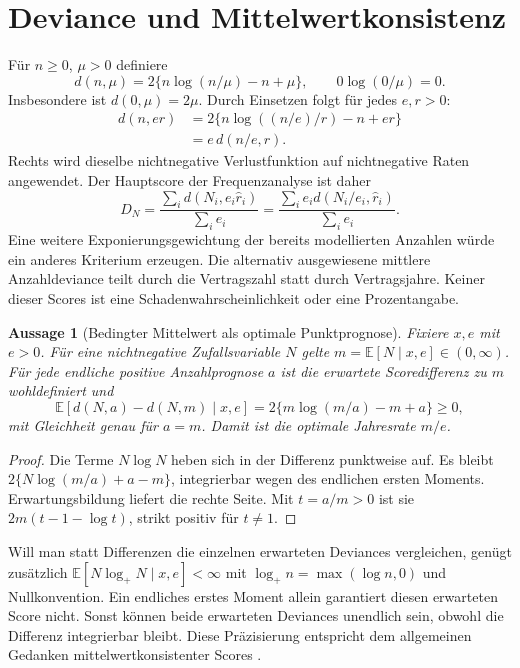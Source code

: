 \documentclass[11pt,a4paper]{article}
\newcommand{\E}{\mathbb E}
\newtheorem{proposition}{Aussage}
\begin{document}
\clearpage
\section{Deviance und Mittelwertkonsistenz}
Für $n\geq0$, $\mu>0$ definiere
\begin{equation}
 d(n,\mu)=2\{n\log(n/\mu)-n+\mu\},\qquad 0\log(0/\mu)=0.
\end{equation}
Insbesondere ist $d(0,\mu)=2\mu$. Durch Einsetzen folgt für jedes $e,r>0$:
\begin{align}
 d(n,er)&=2\{n\log((n/e)/r)-n+er\}\\
        &=e\,d(n/e,r).\label{eq:identity}
\end{align}
Rechts wird dieselbe nichtnegative Verlustfunktion auf nichtnegative Raten angewendet. Der Hauptscore der Frequenzanalyse ist daher
\begin{equation}
 D_N=\frac{\sum_i d(N_i,e_i\widehat r_i)}{\sum_i e_i}
     =\frac{\sum_i e_i d(N_i/e_i,\widehat r_i)}{\sum_i e_i}.
\end{equation}
Eine weitere Exponierungsgewichtung der bereits modellierten Anzahlen würde ein anderes Kriterium erzeugen. Die alternativ ausgewiesene mittlere Anzahldeviance teilt durch die Vertragszahl statt durch Vertragsjahre. Keiner dieser Scores ist eine Schadenwahrscheinlichkeit oder eine Prozentangabe.

\begin{proposition}[Bedingter Mittelwert als optimale Punktprognose]
Fixiere $x,e$ mit $e>0$. Für eine nichtnegative Zufallsvariable $N$ gelte $m=\E[N\mid x,e]\in(0,\infty)$. Für jede endliche positive Anzahlprognose $a$ ist die erwartete \emph{Scoredifferenz} zu $m$ wohldefiniert und
\begin{equation}\label{eq:consistency}
 \E[d(N,a)-d(N,m)\mid x,e]
 =2\{m\log(m/a)-m+a\}\geq0,
\end{equation}
mit Gleichheit genau für $a=m$. Damit ist die optimale Jahresrate $m/e$.
\end{proposition}
\begin{proof}
Die Terme $N\log N$ heben sich in der Differenz punktweise auf. Es bleibt $2\{N\log(m/a)+a-m\}$, integrierbar wegen des endlichen ersten Moments. Erwartungsbildung liefert die rechte Seite. Mit $t=a/m>0$ ist sie $2m(t-1-\log t)$, strikt positiv für $t\neq1$.
\end{proof}
Will man statt Differenzen die einzelnen erwarteten Deviances vergleichen, genügt zusätzlich $\E[N\log_+N\mid x,e]<\infty$ mit $\log_+n=\max(\log n,0)$ und Nullkonvention. Ein endliches erstes Moment allein garantiert diesen erwarteten Score nicht. Sonst können beide erwarteten Deviances unendlich sein, obwohl die Differenz integrierbar bleibt. Diese Präzisierung entspricht dem allgemeinen Gedanken mittelwertkonsistenter Scores \cite{gneiting}.
\end{document}
